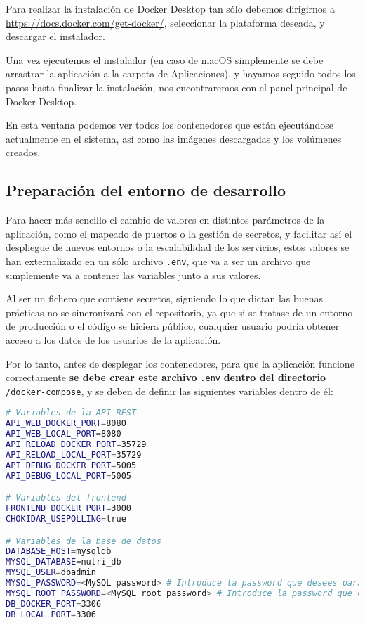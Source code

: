 
Para realizar la instalación de Docker Desktop tan sólo debemos dirigirnos a \url{https://docs.docker.com/get-docker/}, seleccionar la plataforma deseada, y descargar el instalador.


Una vez ejecutemos el instalador (en caso de macOS simplemente se debe arrastrar la aplicación a la carpeta de Aplicaciones), y hayamos seguido todos los pasos hasta finalizar la instalación, nos encontraremos con el panel principal de Docker Desktop. 


En esta ventana podemos ver todos los contenedores que están ejecutándose actualmente en el sistema, así como las imágenes descargadas y los volúmenes creados.

\subsection{Preparación del entorno de desarrollo} \label{entorno-desarrollo}

Para hacer más sencillo el cambio de valores en distintos parámetros de la aplicación, como el mapeado de puertos o la gestión de secretos, y facilitar así el despliegue de nuevos entornos o la escalabilidad de los servicios, estos valores se han externalizado en un sólo archivo \verb,.env,, que va a ser un archivo que simplemente va a contener las variables junto a sus valores. 

Al ser un fichero que contiene secretos, siguiendo lo que dictan las buenas prácticas no se sincronizará con el repositorio, ya que si se tratase de un entorno de producción o el código se hiciera público, cualquier usuario podría obtener acceso a los datos de los usuarios de la aplicación.

Por lo tanto, antes de desplegar los contenedores, para que la aplicación funcione correctamente \textbf{se debe crear este archivo} \verb,.env, \textbf{dentro del directorio} \verb,/docker-compose,, y se deben de definir las siguientes variables dentro de él:

\begin{lstlisting}[language=Bash]
# Variables de la API REST
API_WEB_DOCKER_PORT=8080
API_WEB_LOCAL_PORT=8080
API_RELOAD_DOCKER_PORT=35729
API_RELOAD_LOCAL_PORT=35729
API_DEBUG_DOCKER_PORT=5005
API_DEBUG_LOCAL_PORT=5005

# Variables del frontend
FRONTEND_DOCKER_PORT=3000
CHOKIDAR_USEPOLLING=true

# Variables de la base de datos
DATABASE_HOST=mysqldb
MYSQL_DATABASE=nutri_db
MYSQL_USER=dbadmin
MYSQL_PASSWORD=<MySQL password> # Introduce la password que desees para el usuario dbadmin
MYSQL_ROOT_PASSWORD=<MySQL root password> # Introduce la password que desees para el usuario root
DB_DOCKER_PORT=3306
DB_LOCAL_PORT=3306
\end{lstlisting}

